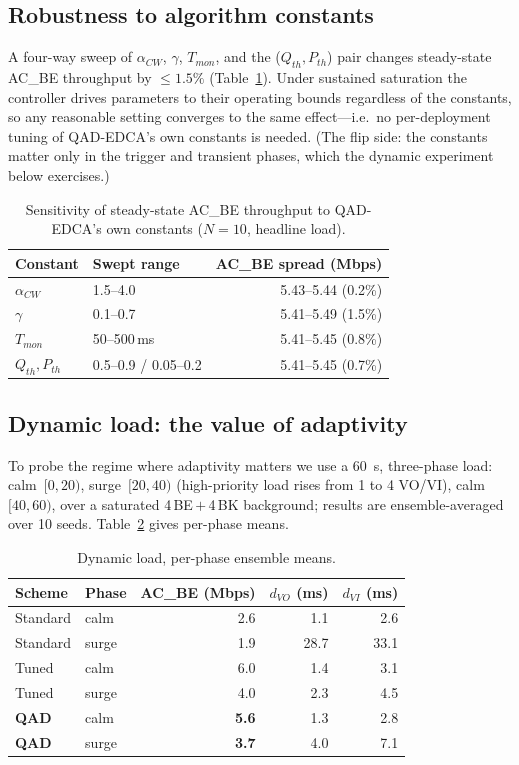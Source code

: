 \documentclass[conference]{IEEEtran}
\newcommand{\AC}[1]{AC\_#1}
\begin{document}
\subsection{Robustness to algorithm constants}
A four-way sweep of $\alpha_{CW}$, $\gamma$, $T_{mon}$, and the
($Q_{th},P_{th}$) pair changes steady-state \AC{BE} throughput by
$\le1.5\%$ (Table~\ref{tab:sens}). Under sustained saturation the controller
drives parameters to their operating bounds regardless of the constants, so any
reasonable setting converges to the same effect---i.e.\ no per-deployment
tuning of QAD-EDCA's own constants is needed. (The flip side: the constants
matter only in the trigger and transient phases, which the dynamic experiment
below exercises.)

\begin{table}[t]
\centering
\caption{Sensitivity of steady-state \AC{BE} throughput to QAD-EDCA's own
constants ($N{=}10$, headline load).}
\label{tab:sens}
\begin{tabular}{@{}llr@{}}
\toprule
Constant & Swept range & \AC{BE} spread (Mbps)\\
\midrule
$\alpha_{CW}$    & 1.5--4.0             & 5.43--5.44 (0.2\%)\\
$\gamma$         & 0.1--0.7             & 5.41--5.49 (1.5\%)\\
$T_{mon}$        & 50--500\,ms          & 5.41--5.45 (0.8\%)\\
$Q_{th},P_{th}$  & 0.5--0.9 / 0.05--0.2 & 5.41--5.45 (0.7\%)\\
\bottomrule
\end{tabular}
\end{table}

\subsection{Dynamic load: the value of adaptivity}
To probe the regime where adaptivity matters we use a 60~s,
three-phase load: calm~$[0,20)$, surge~$[20,40)$ (high-priority load rises
from 1 to 4 VO/VI), calm~$[40,60)$, over a saturated 4\,BE\,$+$\,4\,BK
background; results are ensemble-averaged over 10 seeds.
Table~\ref{tab:dynamic} gives per-phase means.

\begin{table}[t]
\centering
\caption{Dynamic load, per-phase ensemble means.}
\label{tab:dynamic}
\begin{tabular}{@{}llrrr@{}}
\toprule
Scheme & Phase & \AC{BE} (Mbps) & $d_{VO}$ (ms) & $d_{VI}$ (ms)\\
\midrule
Standard & calm  & 2.6 & 1.1  & 2.6\\
Standard & surge & 1.9 & 28.7 & 33.1\\
Tuned    & calm  & 6.0 & 1.4  & 3.1\\
Tuned    & surge & 4.0 & 2.3  & 4.5\\
\textbf{QAD} & calm  & \textbf{5.6} & 1.3 & 2.8\\
\textbf{QAD} & surge & \textbf{3.7} & 4.0 & 7.1\\
\bottomrule
\end{tabular}
\end{table}
\end{document}
